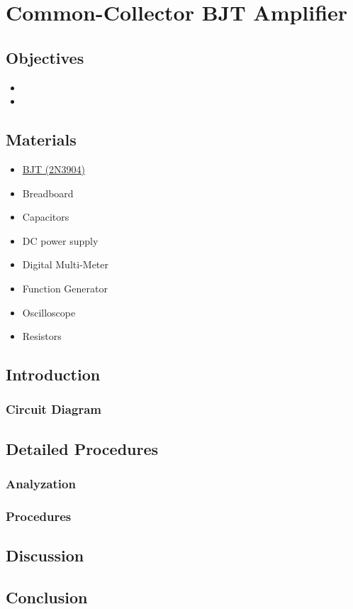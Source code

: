 \chapter{Common-Collector BJT Amplifier}


\section{Objectives}
\begin{itemize}
    \item 
    \item 
\end{itemize}

\section{Materials}
\begin{itemize}
    \item \hyperref[2N3904_1]{BJT (2N3904)}
    \item Breadboard
    \item Capacitors
    \item DC power supply
    \item Digital Multi-Meter
    \item Function Generator
    \item Oscilloscope
    \item Resistors
\end{itemize}

\section{Introduction}
    \subsection{Circuit Diagram}


\section{Detailed Procedures}
    \subsection{Analyzation}


    \subsection{Procedures}

    
\section{Discussion}


\section{Conclusion}
